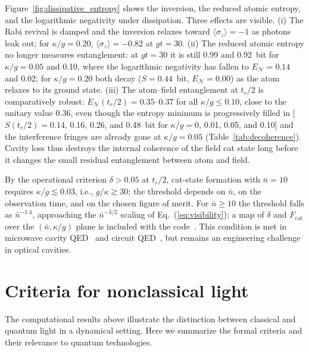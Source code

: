 \documentclass[%
 reprint,
 amsmath,amssymb,
 aps,
 floatfix,
]{revtex4-2}
\begin{document}
Figure~\ref{fig:dissipative_entropy} shows the inversion, the reduced atomic entropy, and the logarithmic negativity under dissipation. Three effects are visible. (i) The Rabi revival is damped and the inversion relaxes toward $\langle\sigma_z\rangle = -1$ as photons leak out; for $\kappa/g = 0.20$, $\langle\sigma_z\rangle = -0.82$ at $gt = 30$. (ii) The reduced atomic entropy no longer measures entanglement: at $gt = 30$ it is still 0.99 and 0.92~bit for $\kappa/g = 0.05$ and 0.10, where the logarithmic negativity has fallen to $E_{\mathcal{N}} = 0.14$ and 0.02; for $\kappa/g = 0.20$ both decay ($S = 0.44$~bit, $E_{\mathcal{N}} = 0.00$) as the atom relaxes to its ground state. (iii) The atom--field entanglement at $t_r/2$ is comparatively robust: $E_{\mathcal{N}}(t_r/2) = 0.35$--$0.37$ for all $\kappa/g \leq 0.10$, close to the unitary value 0.36, even though the entropy minimum is progressively filled in [$S(t_r/2) = 0.14$, 0.16, 0.26, and 0.48~bit for $\kappa/g = 0$, 0.01, 0.05, and 0.10] and the interference fringes are already gone at $\kappa/g = 0.05$ (Table~\ref{tab:decoherence}). Cavity loss thus destroys the internal coherence of the field cat state long before it changes the small residual entanglement between atom and field.

By the operational criterion $\delta > 0.05$ at $t_r/2$, cat-state formation with $\bar{n} = 10$ requires $\kappa/g \lesssim 0.03$, i.e., $g/\kappa \gtrsim 30$; the threshold depends on $\bar{n}$, on the observation time, and on the chosen figure of merit. For $\bar{n} \geq 10$ the threshold falls as $\bar{n}^{-1.4}$, approaching the $\bar{n}^{-3/2}$ scaling of Eq.~(\ref{eq:visibility}); a map of $\delta$ and $F_{\text{cat}}$ over the $(\bar{n}, \kappa/g)$ plane is included with the code~\cite{nguyen2026code}. This condition is met in microwave cavity QED~\cite{haroche2006} and circuit QED~\cite{blais2021}, but remains an engineering challenge in optical cavities.


\section{Criteria for nonclassical light}
\label{sec:criteria}

The computational results above illustrate the distinction between classical and quantum light in a dynamical setting. Here we summarize the formal criteria and their relevance to quantum technologies.
\end{document}

